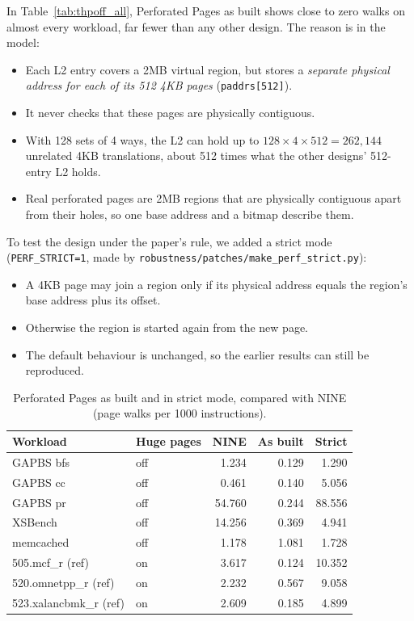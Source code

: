 In Table~\ref{tab:thpoff_all}, Perforated Pages as built shows close to zero walks on almost every workload, far fewer than any other design. The reason is in the model:
\begin{itemize}
    \item Each L2 entry covers a 2MB virtual region, but stores a \emph{separate physical address for each of its 512 4KB pages} (\texttt{paddrs[512]}).
    \item It never checks that these pages are physically contiguous.
    \item With 128 sets of 4 ways, the L2 can hold up to $128 \times 4 \times 512 = 262{,}144$ unrelated 4KB translations, about 512 times what the other designs' 512-entry L2 holds.
    \item Real perforated pages are 2MB regions that are physically contiguous apart from their holes, so one base address and a bitmap describe them.
\end{itemize}

To test the design under the paper's rule, we added a strict mode (\texttt{PERF\_STRICT=1}, made by \texttt{robustness/patches/make\_perf\_strict.py}):
\begin{itemize}
    \item A 4KB page may join a region only if its physical address equals the region's base address plus its offset.
    \item Otherwise the region is started again from the new page.
    \item The default behaviour is unchanged, so the earlier results can still be reproduced.
\end{itemize}

\begin{table}[htbp]
\centering
\small
\caption{Perforated Pages as built and in strict mode, compared with NINE (page walks per 1000 instructions).}
\label{tab:perf_strict}
\begin{tabular}{l l r r r}
\toprule
\textbf{Workload} & \textbf{Huge pages} & \textbf{NINE} & \textbf{As built} & \textbf{Strict} \\
\midrule
GAPBS bfs & off & 1.234 & 0.129 & 1.290 \\
GAPBS cc & off & 0.461 & 0.140 & 5.056 \\
GAPBS pr & off & 54.760 & 0.244 & 88.556 \\
XSBench & off & 14.256 & 0.369 & 4.941 \\
memcached & off & 1.178 & 1.081 & 1.728 \\
505.mcf\_r (ref) & on & 3.617 & 0.124 & 10.352 \\
520.omnetpp\_r (ref) & on & 2.232 & 0.567 & 9.058 \\
523.xalancbmk\_r (ref) & on & 2.609 & 0.185 & 4.899 \\
\bottomrule
\end{tabular}
\end{table}

